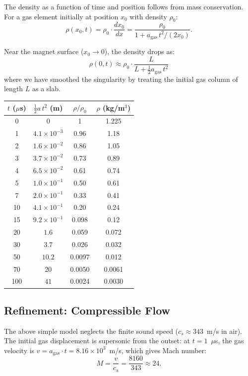 \documentclass[amsmath,amssymb,aps,prd,superscriptaddress,nofootinbib]{revtex4-2}
\begin{document}
The density as a function of time and position follows from mass
conservation. For a gas element initially at position $x_0$ with
density $\rho_0$:
\begin{equation}
\rho(x_0, t) = \rho_0 \cdot \frac{dx_0}{dx}
= \frac{\rho_0}{1 + a_\text{gas}\,t^2/(2x_0)}.
\end{equation}

Near the magnet surface ($x_0 \to 0$), the density drops as:
\begin{equation}\label{eq:rho-t}
\rho(0, t) \approx \rho_0 \cdot \frac{L}{L + \tfrac{1}{2}a_\text{gas}\,t^2}
\end{equation}
where we have smoothed the singularity by treating the initial gas
column of length $L$ as a slab.

\begin{center}
\begin{tabular}{cccc}
\toprule
$t$ ($\mu$s) & $\frac{1}{2}a\,t^2$ (m) & $\rho/\rho_0$ & $\rho$ (kg/m$^3$) \\
\midrule
0 & 0 & 1 & 1.225 \\
1 & $4.1 \times 10^{-3}$ & 0.96 & 1.18 \\
2 & $1.6 \times 10^{-2}$ & 0.86 & 1.05 \\
3 & $3.7 \times 10^{-2}$ & 0.73 & 0.89 \\
4 & $6.5 \times 10^{-2}$ & 0.61 & 0.74 \\
5 & $1.0 \times 10^{-1}$ & 0.50 & 0.61 \\
7 & $2.0 \times 10^{-1}$ & 0.33 & 0.41 \\
10 & $4.1 \times 10^{-1}$ & 0.20 & 0.24 \\
15 & $9.2 \times 10^{-1}$ & 0.098 & 0.12 \\
20 & $1.6$ & 0.059 & 0.072 \\
30 & $3.7$ & 0.026 & 0.032 \\
50 & $10.2$ & 0.0097 & 0.012 \\
70 & $20$ & 0.0050 & 0.0061 \\
100 & $41$ & 0.0024 & 0.0030 \\
\bottomrule
\end{tabular}
\end{center}

\subsection{Refinement: Compressible Flow}

The above simple model neglects the finite sound speed ($c_s \approx
343$~m/s in air). The initial gas displacement is supersonic from the
outset: at $t = 1$~$\mu$s, the gas velocity is $v = a_\text{gas} \cdot
t = 8.16 \times 10^3$~m/s, which gives Mach number:
\begin{equation}
M = \frac{v}{c_s} = \frac{8160}{343} \approx 24.
\end{equation}
\end{document}
